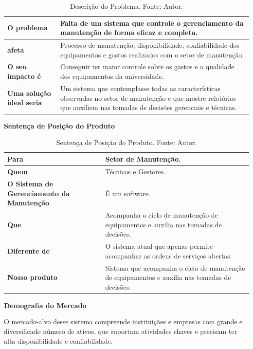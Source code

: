 \begin{table}[H]
\centering
\caption{Descrição do Problema. Fonte: Autor.}
\label{tab-problema}
\begin{tabular}{ | p{5cm} | p{10cm} | }
\hline
	\textbf{O problema} & Falta de um sistema que controle o gerenciamento da manutenção de forma eficaz e completa.  \\ \hline
	\textbf{afeta} & Processo de manutenção, disponibilidade, confiabilidade dos equipamentos e gastos realizados com o setor de manutenção. \\ \hline
	\textbf{O seu impacto é} & Conseguir ter maior controle sobre os gastos e a qualidade dos equipamentos da universidade. \\ \hline
	\textbf{Uma solução ideal seria} & Um sistema que contemplasse todas as características observadas no setor de manutenção e que mostre relatórios que auxiliem nas tomadas de decisões gerenciais e técnicas. \\ \hline
\end{tabular}
\end{table}



\textbf{Sentença de Posição do Produto}

\begin{table}[H]
\centering
\caption{Sentença de Posição do Produto. Fonte: Autor.}
\label{tab-produto}
\begin{tabular}{ | p{5cm} | p{10cm} | }
\hline
	\textbf{Para} & Setor de Manutenção. \\ \hline
	\textbf{Quem} & Técnicos e Gestores. \\ \hline
	\textbf{O Sistema de Gerenciamento da Manutenção} & É um software. \\ \hline
	\textbf{Que} & Acompanha o ciclo de manutenção de equipamentos e auxilia nas tomadas de decisões. \\ \hline
	\textbf{Diferente de} & O sistema atual que apenas permite acompanhar as ordens de serviços abertas. \\ \hline
	\textbf{Nosso produto} & Sistema que acompanha o ciclo de manutenção de equipamentos e auxilia nas tomadas de decisões. \\ \hline
\end{tabular}
\end{table}

\textbf{Demografia do Mercado}

O mercado-alvo desse sistema compreende instituições e empresas com grande e diversificado número de ativos, que suportam atividades chaves e precisam ter alta disponibilidade e confiabilidade.

